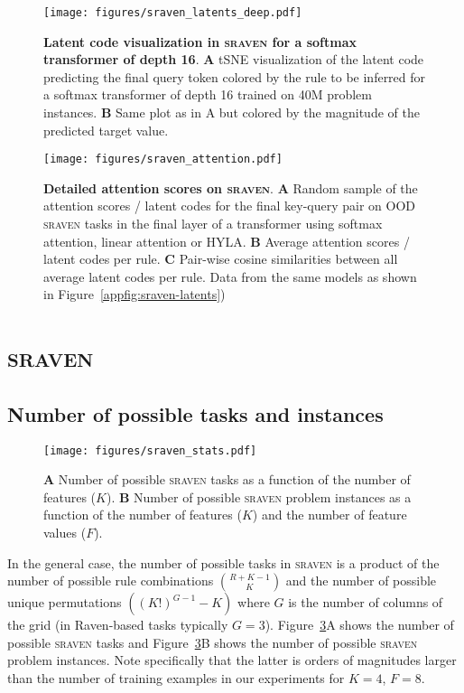 \documentclass{article} \usepackage{iclr2025,times}
\begin{document}
\begin{figure}[p]
    \centering
    \texttt{[image: figures/sraven\_latents\_deep.pdf]}
    \caption{\textbf{Latent code visualization in \textsc{sraven} for a softmax transformer of depth 16}. \textbf{A} tSNE visualization of the latent code predicting the final query token colored by the rule to be inferred for a softmax transformer of depth 16 trained on 40M problem instances. \textbf{B} Same plot as in A but colored by the magnitude of the predicted target value.}
    \label{appfig:sraven-latents-deep}
\end{figure}

\begin{figure}[t]
    \centering
    \texttt{[image: figures/sraven\_attention.pdf]}
    \caption{\textbf{Detailed attention scores on \textsc{sraven}}. \textbf{A} Random sample of the attention scores / latent codes for the final key-query pair on OOD \textsc{sraven} tasks in the final layer of a transformer using softmax attention, linear attention or HYLA. \textbf{B} Average attention scores / latent codes per rule. \textbf{C} Pair-wise cosine similarities between all average latent codes per rule. Data from the same models as shown in Figure~\ref{appfig:sraven-latents})}
    \label{fig:sraven-attention}
\end{figure}


\clearpage

\section{\textsc{sraven}}



\subsection{Number of possible tasks and instances}
\label{appsec:raven-stats}

\begin{figure}[p]
    \centering
    \texttt{[image: figures/sraven\_stats.pdf]}
    \caption{\textbf{A} Number of possible \textsc{sraven} tasks as a function of the number of features ($K$). \textbf{B} Number of possible \textsc{sraven} problem instances as a function of the number of features ($K$) and the number of feature values ($F$).}
    \label{appfig:sraven_stats}
\end{figure}


In the general case, the number of possible tasks in \textsc{sraven} is a product of the number of possible rule combinations $\binom{R + K - 1}{K}$ and the number of possible unique permutations $((K!)^{G-1} - K)$ where $G$ is the number of columns of the grid (in Raven-based tasks typically $G=3$).
Figure~\ref{appfig:sraven_stats}A shows the number of possible \textsc{sraven} tasks and Figure~\ref{appfig:sraven_stats}B shows the number of possible \textsc{sraven} problem instances.
Note specifically that the latter is orders of magnitudes larger than the number of training examples in our experiments for $K=4$, $F=8$.
\end{document}
